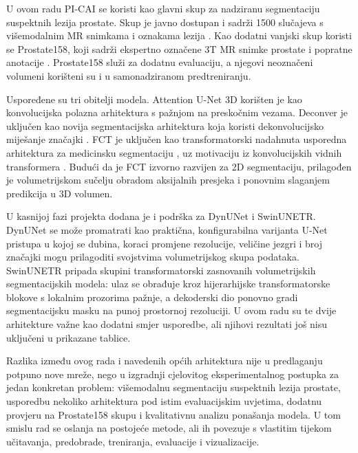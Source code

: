 \documentclass[a4paper,12pt,oneside]{article}
\begin{document}
U ovom radu PI-CAI se koristi kao glavni skup za nadziranu segmentaciju suspektnih lezija prostate. Skup je javno dostupan i sadrži 1500 slučajeva s višemodalnim MR snimkama i oznakama lezija \cite{picai_dataset}. Kao dodatni vanjski skup koristi se Prostate158, koji sadrži ekspertno označene 3T MR snimke prostate i popratne anotacije \cite{prostate158_main,prostate158_dib}. Prostate158 služi za dodatnu evaluaciju, a njegovi neoznačeni volumeni korišteni su i u samonadziranom predtreniranju.

Uspoređene su tri obitelji modela. Attention U-Net 3D korišten je kao konvolucijska polazna arhitektura s pažnjom na preskočnim vezama. Deconver je uključen kao novija segmentacijska arhitektura koja koristi dekonvolucijsko miješanje značajki \cite{deconver}. FCT je uključen kao transformatorski nadahnuta usporedna arhitektura za medicinsku segmentaciju \cite{fct}, uz motivaciju iz konvolucijskih vidnih transformera \cite{cvt}. Budući da je FCT izvorno razvijen za 2D segmentaciju, prilagođen je volumetrijskom sučelju obradom aksijalnih presjeka i ponovnim slaganjem predikcija u 3D volumen.

U kasnijoj fazi projekta dodana je i podrška za DynUNet i SwinUNETR. DynUNet se može promatrati kao praktična, konfigurabilna varijanta U-Net pristupa u kojoj se dubina, koraci promjene rezolucije, veličine jezgri i broj značajki mogu prilagoditi svojstvima volumetrijskog skupa podataka. SwinUNETR pripada skupini transformatorski zasnovanih volumetrijskih segmentacijskih modela: ulaz se obrađuje kroz hijerarhijske transformatorske blokove s lokalnim prozorima pažnje, a dekoderski dio ponovno gradi segmentacijsku masku na punoj prostornoj rezoluciji. U ovom radu su te dvije arhitekture važne kao dodatni smjer usporedbe, ali njihovi rezultati još nisu uključeni u prikazane tablice.


Razlika između ovog rada i navedenih općih arhitektura nije u predlaganju potpuno nove mreže, nego u izgradnji cjelovitog eksperimentalnog postupka za jedan konkretan problem: višemodalnu segmentaciju suspektnih lezija prostate, usporedbu nekoliko arhitektura pod istim evaluacijskim uvjetima, dodatnu provjeru na Prostate158 skupu i kvalitativnu analizu ponašanja modela. U tom smislu rad se oslanja na postojeće metode, ali ih povezuje s vlastitim tijekom učitavanja, predobrade, treniranja, evaluacije i vizualizacije.
\end{document}
